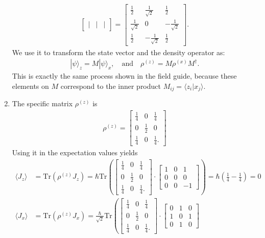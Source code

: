 \documentclass[letterpaper,11pt,twoside]{article}
\newcommand{\ket}[1]{|#1\rangle}
\newcommand{\braket}[1]{\langle#1\rangle}
\begin{document}
\begin{enumerate}[itemsep=0pt,topsep=0pt,label=\alph*)]
\begin{align*}
\begin{bmatrix}
      |&|&|
    \end{bmatrix}=\begin{bmatrix}
      \frac{1}{2}&\frac{1}{\sqrt{2}}&\frac{1}{2}\\
      \frac{1}{\sqrt{2}}&0&-\frac{1}{\sqrt{2}}\\
      \frac{1}{2}&-\frac{1}{\sqrt{2}}&\frac{1}{2}
    \end{bmatrix}.
  \end{align*}
  We use it to transform the state vector and the density operator as:
  \begin{align*}
    \ket{\psi}_z=M\ket{\psi}_x,\quad\text{and}\quad\rho^{(z)}=M\rho^{(x)}M^\dagger.
  \end{align*}
  This is exactly the same process shown in the field guide, because these elements on $M$ correspond to the inner product $M_{ij}=\braket{z_i|x_j}$.
  \item The specific matrix $\rho^{(z)}$ is 
  \begin{align*}
    \rho^{(z)}=\begin{bmatrix}
      \frac{1}{4}&0&\frac{1}{4}\\0&\frac{1}{2}&0\\\frac{1}{4}&0&\frac{1}{4}.
    \end{bmatrix}
  \end{align*}
  Using it in the expectation values yields 
  \begin{align*}
    \braket{J_z}&=\text{Tr}(\rho^{(z)}J_z)=\hbar\text{Tr}\left(\begin{bmatrix}
      \frac{1}{4}&0&\frac{1}{4}\\0&\frac{1}{2}&0\\\frac{1}{4}&0&\frac{1}{4}.
    \end{bmatrix}\cdot\begin{bmatrix}
      1&0&1\\0&0&0\\0&0&-1
    \end{bmatrix}\right)=\hbar\left(\frac{1}{4}-\frac{1}{4}\right)=0\\
    \braket{J_x}&=\text{Tr}(\rho^{(z)}J_x)=\frac{\hbar}{\sqrt{2}}\text{Tr}\left(\begin{bmatrix}
      \frac{1}{4}&0&\frac{1}{4}\\0&\frac{1}{2}&0\\\frac{1}{4}&0&\frac{1}{4}.
    \end{bmatrix}\cdot\begin{bmatrix}
      0&1&0\\1&0&1\\0&1&0

\end{bmatrix}
\end{align*}
\end{enumerate}
\end{document}
